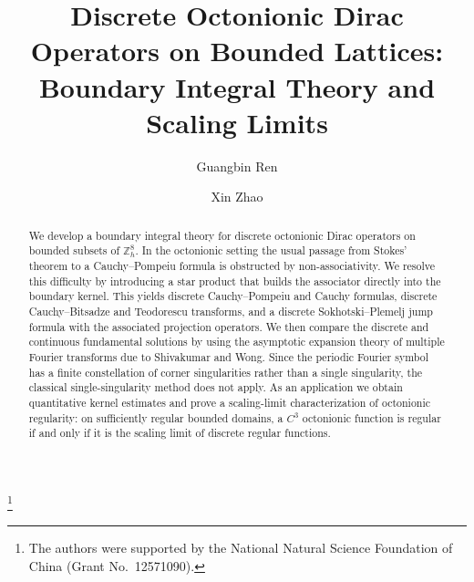 \documentclass{amsart}
\theoremstyle{definition}
\theoremstyle{remark}
\numberwithin{equation}{section}
\newcommand{\Z}{\mathbb Z}
\begin{document}
\title[Discrete octonionic Dirac operators]{Discrete Octonionic Dirac Operators on Bounded Lattices: Boundary Integral Theory and Scaling Limits}

\author{Guangbin Ren}
\address{School  of Mathematical   Sciences, University of Science and Technology of China, Hefei 230026, China}



\author{Xin Zhao}
\address{Department of Mathematics, University of Science and Technology of China, Hefei 230026, China}




 \date{}

\thanks{The authors were supported by the National Natural Science Foundation of China (Grant No.~12571090).}












\begin{abstract}
We develop a boundary integral theory for discrete octonionic Dirac operators on bounded subsets of $\Z_h^8$. In the octonionic setting the usual passage from Stokes' theorem to a Cauchy--Pompeiu formula is obstructed by non-associativity. We resolve this difficulty by introducing a star product that builds the associator directly into the boundary kernel. This yields discrete Cauchy--Pompeiu and Cauchy formulas, discrete Cauchy--Bitsadze and Teodorescu transforms, and a discrete Sokhotski--Plemelj jump formula with the associated projection operators. We then compare the discrete and continuous fundamental solutions by using the asymptotic expansion theory of multiple Fourier transforms due to Shivakumar and Wong. Since the periodic Fourier symbol has a finite constellation of corner singularities rather than a single singularity, the classical single-singularity method does not apply. As an application we obtain quantitative kernel estimates and prove a scaling-limit characterization of octonionic regularity: on sufficiently regular bounded domains, a $C^3$ octonionic function is regular if and only if it is the scaling limit of discrete regular functions.
\end{abstract}
\end{document}
